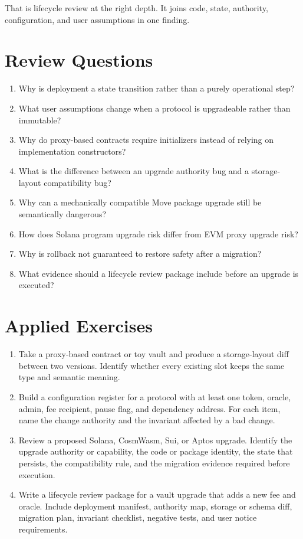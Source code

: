 That is lifecycle review at the right depth. It joins code, state, authority, configuration, and user assumptions in one finding.

\section*{Review Questions}

\begin{enumerate}
\item Why is deployment a state transition rather than a purely operational step?
\item What user assumptions change when a protocol is upgradeable rather than immutable?
\item Why do proxy-based contracts require initializers instead of relying on implementation constructors?
\item What is the difference between an upgrade authority bug and a storage-layout compatibility bug?
\item Why can a mechanically compatible Move package upgrade still be semantically dangerous?
\item How does Solana program upgrade risk differ from EVM proxy upgrade risk?
\item Why is rollback not guaranteed to restore safety after a migration?
\item What evidence should a lifecycle review package include before an upgrade is executed?
\end{enumerate}

\section*{Applied Exercises}

\begin{enumerate}
\item Take a proxy-based contract or toy vault and produce a storage-layout diff between two versions. Identify whether every existing slot keeps the same type and semantic meaning.

\item Build a configuration register for a protocol with at least one token, oracle, admin, fee recipient, pause flag, and dependency address. For each item, name the change authority and the invariant affected by a bad change.

\item Review a proposed Solana, CosmWasm, Sui, or Aptos upgrade. Identify the upgrade authority or capability, the code or package identity, the state that persists, the compatibility rule, and the migration evidence required before execution.

\item Write a lifecycle review package for a vault upgrade that adds a new fee and oracle. Include deployment manifest, authority map, storage or schema diff, migration plan, invariant checklist, negative tests, and user notice requirements.
\end{enumerate}
